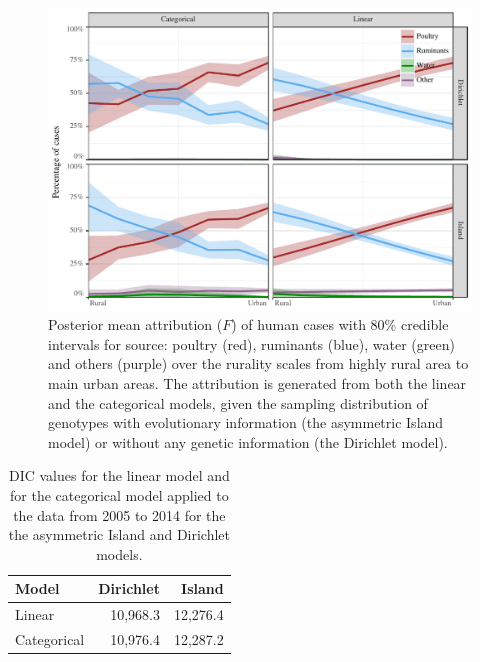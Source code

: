 \documentclass[AMA,STIX1COL]{WileyNJD-v2}
\begin{document}
\begin{figure}
\centering
\includegraphics[width=.9\linewidth]{figures/fig_attribution.pdf}
\caption{Posterior mean attribution ($F$) of human cases with 80\% credible intervals for source: poultry (red), ruminants (blue), water (green) and others (purple) over the rurality scales from highly rural area to main urban areas. The attribution is generated from both the linear and the categorical models, given the sampling distribution of genotypes with evolutionary information (the asymmetric Island model) or without any genetic information (the Dirichlet model).}
\label{fig:attribution}
\end{figure}

\begin{table}
  \begin{center}
	\begin{tabular}{lrr}
	\toprule
	Model & Dirichlet & Island\\
	\midrule
	Linear & 10,968.3 & 12,276.4\\
	Categorical & 10,976.4 & 12,287.2\\
	\bottomrule
	\end{tabular}
  \end{center}
  \caption{DIC values for the linear model and for the categorical model applied to the data from 2005 to 2014 for the the asymmetric Island and Dirichlet models.}
  \label{tab:dic}
\end{table}
\end{document}
